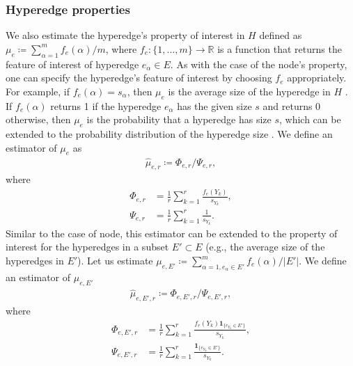 \subsubsection{Hyperedge properties}
We also estimate the hyperedge's property of interest in $H$ defined as $\mu_{e} \coloneqq \sum_{\alpha=1}^m f_e(\alpha) / m$, where $f_e: \{1, \ldots, m\} \to \mathbb{R}$ is a function that returns the feature of interest of hyperedge $e_{\alpha} \in E$.
As with the case of the node's property, one can specify the hyperedge's feature of interest by choosing $f_e$ appropriately.
For example, if $f_e(\alpha) = s_{\alpha}$, then $\mu_{e}$ is the average size of the hyperedge in $H$ \cite{luo2024}. 
If $f_e(\alpha)$ returns 1 if the hyperedge $e_{\alpha}$ has the given size $s$ and returns 0 otherwise, then $\mu_{e}$ is the probability that a hyperedge has size $s$, which can be extended to the probability distribution of the hyperedge size \cite{luo2024}.
We define an estimator of $\mu_{e}$ as
\begin{align}
\hat{\mu}_{e, r} \coloneqq \Phi_{e, r} / \Psi_{e, r},
\label{eq:6}
\end{align}
where
\begin{align*}
\Phi_{e, r} &= \frac{1}{r} \sum_{k=1}^r \frac{f_e(Y_k)}{s_{Y_k}}, \\
\Psi_{e, r} &= \frac{1}{r} \sum_{k=1}^r \frac{1}{s_{Y_k}}.
\end{align*}
Similar to the case of node, this estimator can be extended to the property of interest for the hyperedges in a subset $E' \subset E$ (e.g., the average size of the hyperedges in $E'$).
Let us estimate $\mu_{e, E'} \coloneqq \sum_{\alpha=1, e_{\alpha} \in E'}^m f_e(\alpha) / |E'|$.
We define an estimator of $\mu_{e, E'}$
\begin{align}
\hat{\mu}_{e, E', r} \coloneqq \Phi_{e, E', r} / \Psi_{e, E', r},
\label{eq:7}
\end{align}
where
\begin{align*}
\Phi_{e, E', r} &= \frac{1}{r} \sum_{k=1}^r \frac{f_e(Y_k) \bm{1}_{\{e_{Y_k} \in E'\}}}{s_{Y_k}}, \\
\Psi_{e, E', r} &= \frac{1}{r} \sum_{k=1}^r \frac{\bm{1}_{\{e_{Y_k} \in E'\}}}{s_{Y_k}}.
\end{align*}

